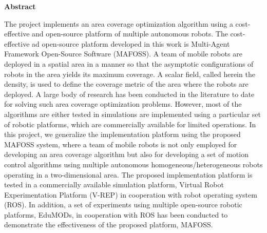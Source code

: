 
\begin{center}\textbf{Abstract}\end{center}

The project implements an area coverage optimization algorithm using a cost-effective and open-source platform of multiple autonomous robots. The cost-effective ad open-source platform developed in this work is Multi-Agent Framework Open-Source Software (MAFOSS). A team of mobile robots are deployed in a spatial area in a manner so that the asymptotic configurations of robots in the area  yields its maximum coverage. A scalar field, called herein the density, is used to define the coverage metric of the area where the robots are deployed. A large body of research has been conducted in the literature to date for solving such area coverage optimization problems. However, most of the algorithms are either tested in simulations are implemented using a particular set of robotic platforms, which are commercially available for limited operations. In this project, we generalize the implementation platform using the proposed MAFOSS system, where a team of mobile robots is not only employed for developing an area coverage algorithm but also for developing a set of motion control algorithms using multiple autonomous homogeneous/heterogeneous robots operating in a two-dimensional area. The proposed implementation platform is tested in a commercially available simulation platform, Virtual Robot Experimentation Platform (V-REP) in cooperation with robot operating system (ROS).  In addition, a set of experiments using multiple open-source robotic platforms, EduMODs, in cooperation with ROS has been conducted to demonstrate the effectiveness of the proposed platform, MAFOSS.   


\cleardoublepage


